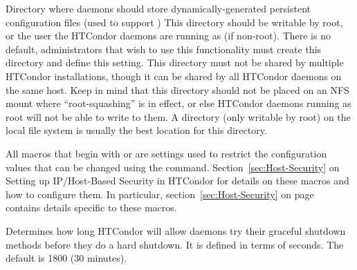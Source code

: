\begin{description}
\label{param:PersistentConfigDir}
\item[\Macro{PERSISTENT\_CONFIG\_DIR}]
  Directory where daemons should store dynamically-generated
  persistent configuration files (used to support
   )
  This directory should  be writable by root, or the user
  the HTCondor daemons are running as (if non-root).
  There is no default, administrators that wish to use this
  functionality must create this directory and define this setting.
  This directory must not be shared by multiple HTCondor installations,
  though it can be shared by all HTCondor daemons on the same host.
  Keep in mind that this directory should not be placed on an NFS
  mount where ``root-squashing'' is in effect, or else HTCondor daemons
  running as root will not be able to write to them.
  A directory (only writable by root) on the local file system is
  usually the best location for this directory.

\label{param:SettableAttrs}
\item[\Macro{SETTABLE\_ATTRS\Dots}]
  All macros that begin with  or
   are settings used to restrict the 
  configuration values that can be changed using the  
  command.
  Section~\ref{sec:Host-Security} on Setting up
  IP/Host-Based Security in HTCondor for details on these
  macros and how to configure them.  
  In particular, section~\ref{sec:Host-Security}
  on page~\pageref{sec:Host-Security} contains details specific to
  these macros.

\label{param:ShutdownGracefulTimeout}
\item[\Macro{SHUTDOWN\_GRACEFUL\_TIMEOUT}]
  Determines how long
  HTCondor will allow daemons try their graceful shutdown methods
  before they do a hard shutdown.  It is defined in terms of seconds.
  The default is 1800 (30 minutes).


\end{description}
